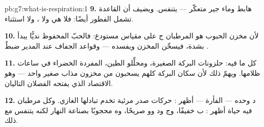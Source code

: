 \begin{solution}{pb:g7:what-is-respiration:1}
\textbf{9.}  هابط وماء جير متعكّر ---  يتنفس. ويضيف أن
القاعدة تشمل الفطور أيضًا: فلا هي  ولا ، ولا استثناء.

\textbf{10.} لأن مخزن الحبوب هو المرطبان ج على مقياس مستودع:
فالحبّ المحفوظ نديًّا يبدأ   بشدة، فيسخّن المخزن
ويفسده --- وقواعد الجفاف عند المدير ضبطٌ .

\textbf{11.} كل ما فيه: حلزونات البركة  الصغيرة،
ومحلِّلو الطين،   المفردة الخضراء في ساعات ظلامها.
ويهمّ ذلك لأن سكان البركة كلهم يسحبون من مخزون  مذاب صغير
واحد --- وهو الاقتصاد الذي يفتحه الفصلان التاليان.

\textbf{12.} د وحده --- الفأرة --- أظهر : حركات
صدر مرئية تخدم تبادلها الغازي. وكل مرطبان فيه حياة أظهر :
ب خفيفًا، وج ود وو صريحًا، وه محجوبًا بصناعة النهار لكنه يتنفس
مع ذلك.
\end{solution}
